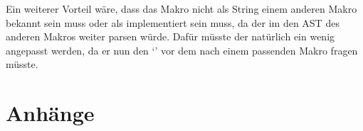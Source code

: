 \begin{enumerate}[ref=\autoref{ssec:Ausblick}: Punkt \arabic*]
        Ein weiterer Vorteil wäre, dass das Makro nicht als String einem anderen Makro bekannt sein muss oder als  implementiert sein muss, da der  im den AST des anderen Makros weiter parsen würde. Dafür müsste der  natürlich ein wenig angepasst werden, da er nun den `' vor dem  nach einem passenden Makro fragen müsste.
    \end{enumerate}



\begingroup
\sloppy
\printbibliography
\endgroup
\listoffigures
\listofmyCodeEnvTypes
{} %


\section*{Anhänge}
\label{sec:Anhänge}


